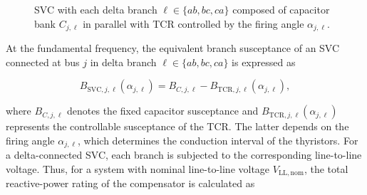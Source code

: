 \documentclass[journal]{IEEEtran}
\begin{document}
\begin{figure}[htpb!]
{%
}
    \caption{SVC with each delta branch
    $\ell\in\{ab,bc,ca\}$ composed of capacitor bank $C_{j,\ell}$ in parallel
    with TCR controlled by the firing angle $\alpha_{j,\ell}$.}
    \label{fig:delta_fc_tcr_svc}
\end{figure}


At the fundamental frequency, the equivalent branch susceptance of an SVC connected at bus $j$ in
delta branch $\ell \in \{ab,bc,ca\}$ is expressed as

\begin{equation}
    B_{\mathrm{SVC},j,\ell}(\alpha_{j,\ell}) =
    B_{C,j,\ell} - B_{\mathrm{TCR},j,\ell}(\alpha_{j,\ell}),
    \label{eq:svc_susceptance}
\end{equation}

\noindent where $B_{C,j,\ell}$ denotes the fixed capacitor susceptance and
$B_{\mathrm{TCR},j,\ell}(\alpha_{j,\ell})$ represents the controllable
susceptance of the TCR. The latter depends on
the firing angle $\alpha_{j,\ell}$, which determines the conduction interval
of the thyristors. For a delta-connected SVC, each branch is subjected to the
corresponding line-to-line voltage. Thus, for a system with nominal
line-to-line voltage $V_{\mathrm{LL,nom}}$, the total reactive-power rating
of the compensator is calculated as
\end{document}
